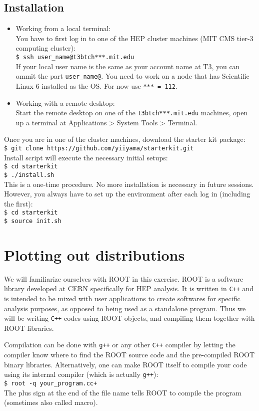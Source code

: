 \documentclass[12pt]{article}
\newcommand{\cpp}{\texttt{C++}\xspace}
\newcommand{\terminal}[1]{\vspace{3pt}\texttt{\$ #1} \\}
\begin{document}
\subsection*{Installation}
\begin{itemize}
\item Working from a local terminal: \\
  You have to first log in to one of the HEP cluster machines (MIT CMS tier-3 computing cluster): \\
  \terminal{ssh user\_name@t3btch***.mit.edu}
  If your local user name is the same as your account name at T3, you can ommit the part \texttt{user\_name@}. You need to work on a node that has Scientific Linux 6 installed as the OS. For now use \texttt{*** = 112}.
\item Working with a remote desktop: \\
  Start the remote desktop on one of the \texttt{t3btch***.mit.edu} machines, open up a terminal at Applications > System Tools > Terminal.
\end{itemize}

Once you are in one of the cluster machines, download the starter kit package: \\
\terminal{git clone https://github.com/yiiyama/starterkit.git}
Install script will execute the necessary initial setups: \\
\terminal{cd starterkit}
\terminal{./install.sh}
This is a one-time procedure. No more installation is necessary in future sessions. However, you always have to set up the environment after each log in (including the first): \\
\terminal{cd starterkit}
\terminal{source init.sh}

\setcounter{section}{0}

\section{Plotting out distributions}
We will familiarize ourselves with ROOT in this exercise. ROOT is a software library developed at CERN specifically for HEP analysis. It is written in \cpp and is intended to be mixed with user applications to create softwares for specific analysis purposes, as opposed to being used as a standalone program. Thus we will be writing \cpp codes using ROOT objects, and compiling them together with ROOT libraries.

Compilation can be done with \texttt{g++} or any other \cpp compiler by letting the compiler know where to find the ROOT source code and the pre-compiled ROOT binary libraries. Alternatively, one can make ROOT itself to compile your code using its internal compiler (which is actually \texttt{g++}): \\
\terminal{root -q your\_program.cc+}
The plus sign at the end of the file name tells ROOT to compile the program (sometimes also called macro).
\end{document}
